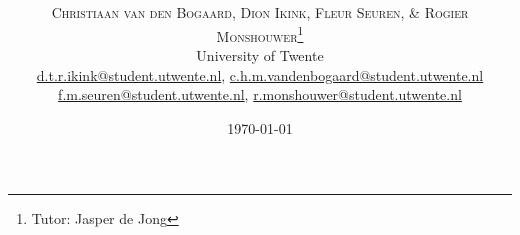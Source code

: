 \documentclass[twoside]{article}
\title{\vspace{-15mm}\fontsize{24pt}{10pt}\selectfont\textbf{\articletitle}} %
\author{
\large
\textsc{Christiaan van den Bogaard, Dion Ikink, Fleur Seuren, \& Rogier Monshouwer}\thanks{Tutor: Jasper de Jong}\\[2mm] %
\normalsize University of Twente \\ %
\normalsize \href{mailto:d.t.r.ikink@student.utwente.nl}{d.t.r.ikink@student.utwente.nl}, 
\href{mailto:c.h.m.vandenbogaard@student.utwente.nl}{c.h.m.vandenbogaard@student.utwente.nl} \\
\normalsize\href{mailto:f.seuren@student.utwente.nl}{f.m.seuren@student.utwente.nl}, %
\href{mailto:r.monshouwer@student.utwente.nl}{r.monshouwer@student.utwente.nl}
}
\date{\today}
\begin{document}
\thispagestyle{empty}
\maketitle %


\begin{abstract}

\noindent \lipsum[1] %

\end{abstract}

\end{document}
